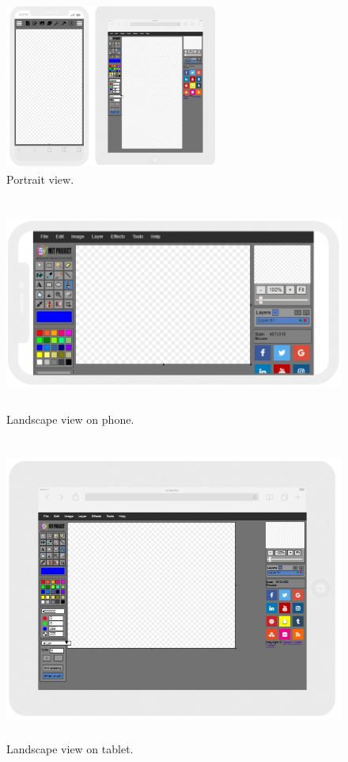 \documentclass[12pt,a4 paper]{report}
\begin{document}
\begin{figure}[h]
\begin{center}
\includegraphics[width=7cm, height=5.5cm]{pot.jpg}
\caption{Portrait view.}
\end{center}
\end{figure}

\begin{figure}[h]
\begin{center}
\includegraphics[width=14cm, height=7cm]{ls2.png}
\caption{Landscape view on phone.}
\end{center}
\end{figure}

\begin{figure}[h]
\begin{center}
\includegraphics[width=13cm, height=10cm]{ls1.png}
\caption{Landscape view on tablet.}
\end{center}
\end{figure}
\end{document}
